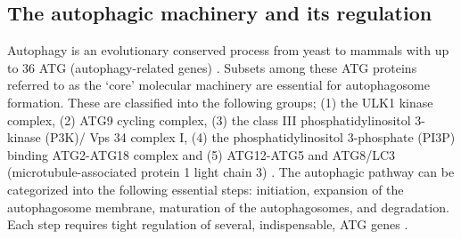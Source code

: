 \subsection{The autophagic machinery and its regulation}
Autophagy is an evolutionary conserved process from yeast to mammals with up to 36 ATG (autophagy-related genes) \citep{Thumm1994,Tsukada1993,Klionsky2007,Mizushima2010}. Subsets among these ATG proteins referred to as the ‘core’ molecular machinery are essential for autophagosome formation. These are classified into the following groups; (1) the ULK1 kinase complex, (2) ATG9 cycling complex, (3) the class III phosphatidylinositol 3-kinase (P3K)/ Vps 34 complex I, (4) the phosphatidylinositol 3-phosphate (PI3P) binding ATG2-ATG18 complex and (5) ATG12-ATG5 and ATG8/LC3 (microtubule-associated protein 1 light chain 3) \citep{Feng2014,Yang2010}. The autophagic pathway can be categorized into the following essential steps: initiation, expansion of the autophagosome membrane, maturation of the autophagosomes, and degradation. Each step requires tight regulation of several, indispensable, ATG genes \citep{Feng2014,Maday2014,Parzych2014}. 

